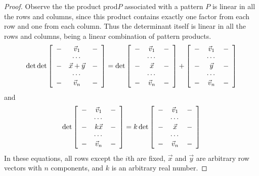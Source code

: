 \documentclass[10pt]{report}
\begin{document}
\begin{proof}
Observe the the product prod$P$ associated with a pattern $P$ is linear in all the rows and columns, since this product contains exactly one factor from each row and one from each column. Thus the determinant itself is linear in all the rows and columns, being a linear combination of pattern products. 
$$\det \det \left[\begin{array}{c c c}
- & \vec{v}_1 & -\\
& \cdots & \\
- & \vec{x} + \vec{y} & -\\
& \cdots & \\
- & \vec{v}_n & -\\
\end{array}\right] = \det \left[\begin{array}{c c c}
- & \vec{v}_1 & -\\
& \cdots & \\
- & \vec{x} & -\\
& \cdots & \\
- & \vec{v}_n & -\\
\end{array}\right] + \left[\begin{array}{c c c}
- & \vec{v}_1 & -\\
& \cdots & \\
- & \vec{y} & -\\
& \cdots & \\
- & \vec{v}_n & -\\
\end{array}\right]$$
and
$$\det \left[\begin{array}{c c c}
- & \vec{v}_1 & -\\
& \cdots & \\
- & k\vec{x} & -\\
& \cdots & \\
- & \vec{v}_n & -\\
\end{array}\right] = k\det \left[\begin{array}{c c c}
- & \vec{v}_1 & -\\
& \cdots & \\
- & \vec{x} & -\\
& \cdots & \\
- & \vec{v}_n & -\\
\end{array}\right]$$
In these equations, all rows except the $i$th are fixed, $\vec{x}$ and $\vec{y}$ are arbitrary row vectors with $n$ components, and $k$ is an arbitrary real number.
\end{proof}
\end{document}
